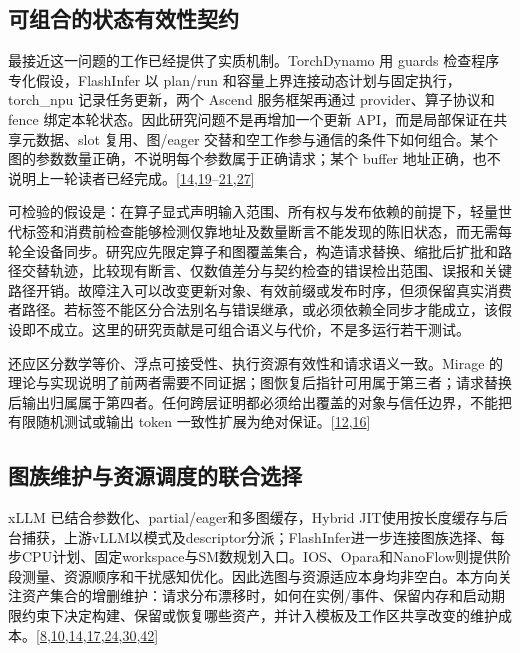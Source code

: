 \documentclass[
  UTF8,
  zihao=5]{ctexart}
\begin{document}
\hypertarget{ux53efux7ec4ux5408ux7684ux72b6ux6001ux6709ux6548ux6027ux5951ux7ea6}{%
\subsection{可组合的状态有效性契约}\label{ux53efux7ec4ux5408ux7684ux72b6ux6001ux6709ux6548ux6027ux5951ux7ea6}}

最接近这一问题的工作已经提供了实质机制。TorchDynamo 用 guards
检查程序专化假设，FlashInfer 以 plan/run
和容量上界连接动态计划与固定执行，torch\_npu 记录任务更新，两个 Ascend
服务框架再通过 provider、算子协议和 fence
绑定本轮状态。因此研究问题不是再增加一个更新
API，而是局部保证在共享元数据、slot 复用、图/eager
交替和空工作参与通信的条件下如何组合。某个图的参数数量正确，不说明每个参数属于正确请求；某个
buffer
地址正确，也不说明上一轮读者已经完成。{[}\protect\hyperlink{ref-ye2025flashinfer}{14},\protect\hyperlink{ref-torchnpu2026graphs}{19}--\protect\hyperlink{ref-sglang2026impl}{21},\protect\hyperlink{ref-ansel2024pytorch2}{27}{]}

可检验的假设是：在算子显式声明输入范围、所有权与发布依赖的前提下，轻量世代标签和消费前检查能够检测仅靠地址及数量断言不能发现的陈旧状态，而无需每轮全设备同步。研究应先限定算子和图覆盖集合，构造请求替换、缩批后扩批和路径交替轨迹，比较现有断言、仅数值差分与契约检查的错误检出范围、误报和关键路径开销。故障注入可以改变更新对象、有效前缀或发布时序，但须保留真实消费者路径。若标签不能区分合法别名与错误继承，或必须依赖全同步才能成立，该假设即不成立。这里的研究贡献是可组合语义与代价，不是多运行若干测试。

还应区分数学等价、浮点可接受性、执行资源有效性和请求语义一致。Mirage
的理论与实现说明了前两者需要不同证据；图恢复后指针可用属于第三者；请求替换后输出归属属于第四者。任何跨层证明都必须给出覆盖的对象与信任边界，不能把有限随机测试或输出
token
一致性扩展为绝对保证。{[}\protect\hyperlink{ref-wu2025mirage}{12},\protect\hyperlink{ref-liu2026foundry}{16}{]}

\hypertarget{ux56feux65cfux7ef4ux62a4ux4e0eux8d44ux6e90ux8c03ux5ea6ux7684ux8054ux5408ux9009ux62e9}{%
\subsection{图族维护与资源调度的联合选择}\label{ux56feux65cfux7ef4ux62a4ux4e0eux8d44ux6e90ux8c03ux5ea6ux7684ux8054ux5408ux9009ux62e9}}

xLLM 已结合参数化、partial/eager和多图缓存，Hybrid
JIT使用按长度缓存与后台捕获，上游vLLM以模式及descriptor分派；FlashInfer进一步连接图族选择、每步CPU计划、固定workspace与SM数规划入口。IOS、Opara和NanoFlow则提供阶段测量、资源顺序和干扰感知优化。因此选图与资源适应本身均非空白。本方向关注资产集合的增删维护：请求分布漂移时，如何在实例/事件、保留内存和启动期限约束下决定构建、保留或恢复哪些资产，并计入模板及工作区共享改变的维护成本。{[}\protect\hyperlink{ref-ding2021ios}{8},\protect\hyperlink{ref-chen2025opara}{10},\protect\hyperlink{ref-ye2025flashinfer}{14},\protect\hyperlink{ref-liu2025xllm}{17},\protect\hyperlink{ref-yadav2026hybridpreprint}{24},\protect\hyperlink{ref-zhu2025nanoflow}{30},\protect\hyperlink{ref-vllmcudagraphdesign}{42}{]}
\end{document}
